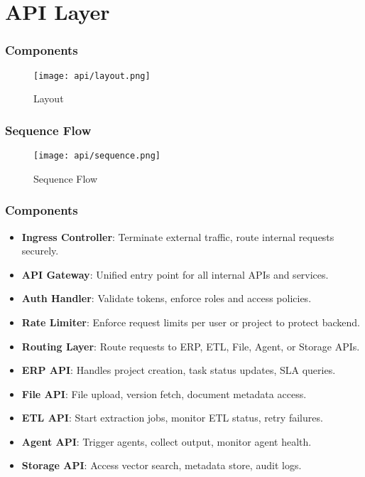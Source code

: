 \section{API Layer} 

\begin{frame}
    \frametitle{ Components}
    \begin{figure}
        \centering
        \texttt{[image: api/layout.png]} %
        \caption{Layout}
    \end{figure}
\end{frame}

\begin{frame}
    \frametitle{Sequence Flow}
    \begin{figure}
        \centering
        \texttt{[image: api/sequence.png]} %
        \caption{Sequence Flow}
    \end{figure}
\end{frame}

\begin{frame}
    \frametitle{Components}
    \begin{itemize}
        \item \textbf{Ingress Controller}: Terminate external traffic, route internal requests securely.
        \item \textbf{API Gateway}: Unified entry point for all internal APIs and services.
        \item \textbf{Auth Handler}: Validate tokens, enforce roles and access policies.
        \item \textbf{Rate Limiter}: Enforce request limits per user or project to protect backend.
        \item \textbf{Routing Layer}: Route requests to ERP, ETL, File, Agent, or Storage APIs.
        \item \textbf{ERP API}: Handles project creation, task status updates, SLA queries.
        \item \textbf{File API}: File upload, version fetch, document metadata access.
        \item \textbf{ETL API}: Start extraction jobs, monitor ETL status, retry failures.
        \item \textbf{Agent API}: Trigger agents, collect output, monitor agent health.
        \item \textbf{Storage API}: Access vector search, metadata store, audit logs.
    \end{itemize}
\end{frame}



